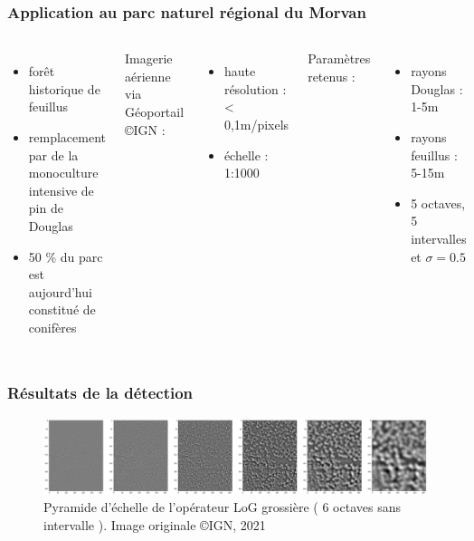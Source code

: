 \documentclass{beamer}
\begin{document}
\begin{frame}
	\frametitle{Application au parc naturel régional du Morvan}
	\begin{columns}
	\begin{itemize}
		\item forêt historique de feuillus
		\item remplacement par de la monoculture intensive de pin de Douglas
		\item 50 \% du parc est aujourd'hui constitué de conifères
	\end{itemize}

	Imagerie aérienne via Géoportail \copyright IGN :
	\begin{itemize}
	\item haute résolution : < 0,1m/pixels
	\item échelle : 1:1000
	\end{itemize}

	Paramètres retenus :
	\begin{itemize}
		\item rayons Douglas : 1-5m
		\item rayons feuillus : 5-15m
		\item 5 octaves, 5 intervalles et $\sigma=0.5$
	\end{itemize}

	\centering
	\begin{figure}
		\includegraphics[scale=0.21,angle=90]{ilu.png}
	\end{figure}

\end{columns}
\end{frame}

\begin{frame}
	\frametitle{Résultats de la détection}
	\begin{figure}
	\includegraphics[scale=0.15]{index.png}
	\caption{Pyramide d'échelle de l'opérateur LoG grossière ( 6 octaves sans intervalle ). Image originale \copyright IGN, 2021  }
	\end{figure}
\end{frame}
\end{document}

